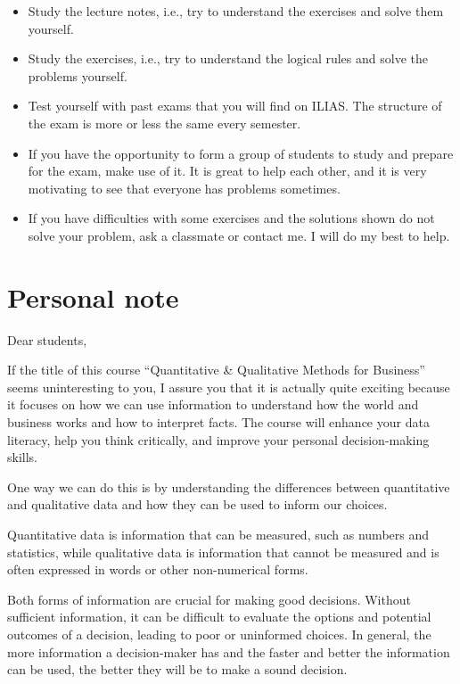 \documentclass[
  12pt,
  oneside]{book}
\providecommand{\tightlist}{%
  \setlength{\itemsep}{0pt}\setlength{\parskip}{0pt}}
\theoremstyle{definition}
\theoremstyle{definition}
\theoremstyle{definition}
\theoremstyle{definition}
\theoremstyle{remark}
\begin{document}
\begin{itemize}
\tightlist
\item
  Study the lecture notes, i.e., try to understand the exercises and solve them yourself.
\item
  Study the exercises, i.e., try to understand the logical rules and solve the problems yourself.
\item
  Test yourself with past exams that you will find on ILIAS. The structure of the exam is more or less the same every semester.
\item
  If you have the opportunity to form a group of students to study and prepare for the exam, make use of it. It is great to help each other, and it is very motivating to see that everyone has problems sometimes.
\item
  If you have difficulties with some exercises and the solutions shown do not solve your problem, ask a classmate or contact me. I will do my best to help.
\end{itemize}

\hypertarget{personal-note}{%
\section*{Personal note}\label{personal-note}}

Dear students,

If the title of this course ``Quantitative \& Qualitative Methods for Business'' seems uninteresting to you, I assure you that it is actually quite exciting because it focuses on how we can use information to understand how the world and business works and how to interpret facts. The course will enhance your data literacy, help you think critically, and improve your personal decision-making skills.

One way we can do this is by understanding the differences between quantitative and qualitative data and how they can be used to inform our choices.

Quantitative data is information that can be measured, such as numbers and statistics, while qualitative data is information that cannot be measured and is often expressed in words or other non-numerical forms.

Both forms of information are crucial for making good decisions. Without sufficient information, it can be difficult to evaluate the options and potential outcomes of a decision, leading to poor or uninformed choices. In general, the more information a decision-maker has and the faster and better the information can be used, the better they will be to make a sound decision.
\end{document}
